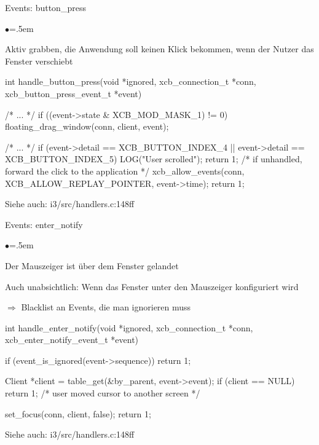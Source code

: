 \documentclass[mode=print,paper=screen,style=jefka]{powerdot}
\newcommand{\isrc}[1]{\begin{center} \footnotesize\ttfamily Siehe auch: #1 \end{center}}
\begin{document}
\begin{slide}[method=direct]{Events: button\_press}
\begin{list}{$\bullet$}{\itemsep=.5em}
	\item Aktiv grabben, die Anwendung soll keinen Klick bekommen, wenn der Nutzer das Fenster verschiebt
\end{list}
\begin{code}
int handle_button_press(void *ignored, xcb_connection_t *conn,
		        xcb_button_press_event_t *event) {
        /* ... */
        if ((event->state & XCB_MOD_MASK_1) != 0)
		floating_drag_window(conn, client, event);

	/* ... */
	if (event->detail == XCB_BUTTON_INDEX_4 ||
	    event->detail == XCB_BUTTON_INDEX_5) {
		LOG("User scrolled\n");
		return 1;
	}
	/* if unhandled, forward the click to the application */
	xcb_allow_events(conn, XCB_ALLOW_REPLAY_POINTER, event->time);
	return 1;
}
\end{code}
\isrc{i3/src/handlers.c:148ff}
\end{slide}


\begin{slide}[method=direct]{Events: enter\_notify}
\begin{list}{$\bullet$}{\itemsep=.5em}
	\item Der Mauszeiger ist über dem Fenster gelandet
	\item Auch unabsichtlich: Wenn das Fenster unter den Mauszeiger konfiguriert wird
	\item $\Rightarrow$ Blacklist an Events, die man ignorieren muss
\end{list}

\begin{code}
int handle_enter_notify(void *ignored, xcb_connection_t *conn,
			xcb_enter_notify_event_t *event) {
        if (event_is_ignored(event->sequence))
                return 1;

        Client *client = table_get(&by_parent, event->event);
	if (client == NULL) {
		return 1; /* user moved cursor to another screen */
	}

        set_focus(conn, client, false);
	return 1;
}
\end{code}
\isrc{i3/src/handlers.c:148ff}
\end{slide}
\end{document}
